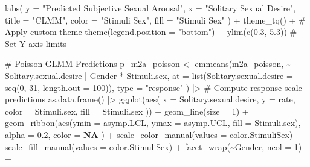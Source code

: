 \documentclass[
  bookmarksnumbered]{article}
\newenvironment{Shaded}{\begin{snugshade}}{\end{snugshade}}
\newcommand{\AttributeTok}[1]{\textcolor[rgb]{0.80,0.80,0.80}{#1}}
\newcommand{\CommentTok}[1]{\textcolor[rgb]{0.50,0.62,0.50}{#1}}
\newcommand{\ConstantTok}[1]{\textcolor[rgb]{0.86,0.64,0.64}{\textbf{#1}}}
\newcommand{\DecValTok}[1]{\textcolor[rgb]{0.86,0.86,0.80}{#1}}
\newcommand{\FloatTok}[1]{\textcolor[rgb]{0.75,0.75,0.82}{#1}}
\newcommand{\FunctionTok}[1]{\textcolor[rgb]{0.94,0.94,0.56}{#1}}
\newcommand{\NormalTok}[1]{\textcolor[rgb]{0.80,0.80,0.80}{#1}}
\newcommand{\OtherTok}[1]{\textcolor[rgb]{0.94,0.94,0.56}{#1}}
\newcommand{\SpecialCharTok}[1]{\textcolor[rgb]{0.86,0.64,0.64}{#1}}
\newcommand{\StringTok}[1]{\textcolor[rgb]{0.80,0.58,0.58}{#1}}
\begin{document}
\begin{Shaded}
\begin{Highlighting}[]
  \FunctionTok{labs}\NormalTok{(}
    \AttributeTok{y =} \StringTok{"Predicted Subjective Sexual Arousal"}\NormalTok{, }\AttributeTok{x =} \StringTok{"Solitary Sexual Desire"}\NormalTok{,}
    \AttributeTok{title =} \StringTok{"CLMM"}\NormalTok{,}
    \AttributeTok{color =} \StringTok{"Stimuli Sex"}\NormalTok{, }\AttributeTok{fill =} \StringTok{"Stimuli Sex"}
\NormalTok{  ) }\SpecialCharTok{+}
  \FunctionTok{theme\_tq}\NormalTok{() }\SpecialCharTok{+} \CommentTok{\# Apply custom theme}
  \FunctionTok{theme}\NormalTok{(}\AttributeTok{legend.position =} \StringTok{"bottom"}\NormalTok{) }\SpecialCharTok{+}
  \FunctionTok{ylim}\NormalTok{(}\FunctionTok{c}\NormalTok{(}\FloatTok{0.3}\NormalTok{, }\FloatTok{5.3}\NormalTok{)) }\CommentTok{\# Set Y{-}axis limits}

\CommentTok{\# Poisson GLMM Predictions}
\NormalTok{p\_m2a\_poisson }\OtherTok{\textless{}{-}} \FunctionTok{emmeans}\NormalTok{(m2a\_poisson, }\SpecialCharTok{\textasciitilde{}}\NormalTok{ Solitary.sexual.desire }\SpecialCharTok{|}\NormalTok{ Gender }\SpecialCharTok{*}\NormalTok{ Stimuli.sex,}
  \AttributeTok{at =} \FunctionTok{list}\NormalTok{(}\AttributeTok{Solitary.sexual.desire =} \FunctionTok{seq}\NormalTok{(}\DecValTok{0}\NormalTok{, }\DecValTok{31}\NormalTok{, }\AttributeTok{length.out =} \DecValTok{100}\NormalTok{)),}
  \AttributeTok{type =} \StringTok{"response"}
\NormalTok{) }\SpecialCharTok{|\textgreater{}} \CommentTok{\# Compute response{-}scale predictions}
  \FunctionTok{as.data.frame}\NormalTok{() }\SpecialCharTok{|\textgreater{}}
  \FunctionTok{ggplot}\NormalTok{(}\FunctionTok{aes}\NormalTok{(}
    \AttributeTok{x =}\NormalTok{ Solitary.sexual.desire, }\AttributeTok{y =}\NormalTok{ rate,}
    \AttributeTok{color =}\NormalTok{ Stimuli.sex, }\AttributeTok{fill =}\NormalTok{ Stimuli.sex}
\NormalTok{  )) }\SpecialCharTok{+}
  \FunctionTok{geom\_line}\NormalTok{(}\AttributeTok{size =} \DecValTok{1}\NormalTok{) }\SpecialCharTok{+}
  \FunctionTok{geom\_ribbon}\NormalTok{(}\FunctionTok{aes}\NormalTok{(}\AttributeTok{ymin =}\NormalTok{ asymp.LCL, }\AttributeTok{ymax =}\NormalTok{ asymp.UCL, }\AttributeTok{fill =}\NormalTok{ Stimuli.sex),}
    \AttributeTok{alpha =} \FloatTok{0.2}\NormalTok{, }\AttributeTok{color =} \ConstantTok{NA}
\NormalTok{  ) }\SpecialCharTok{+}
  \FunctionTok{scale\_color\_manual}\NormalTok{(}\AttributeTok{values =}\NormalTok{ color.StimuliSex) }\SpecialCharTok{+}
  \FunctionTok{scale\_fill\_manual}\NormalTok{(}\AttributeTok{values =}\NormalTok{ color.StimuliSex) }\SpecialCharTok{+}
  \FunctionTok{facet\_wrap}\NormalTok{(}\SpecialCharTok{\textasciitilde{}}\NormalTok{Gender, }\AttributeTok{ncol =} \DecValTok{1}\NormalTok{) }\SpecialCharTok{+}

\end{Highlighting}
\end{Shaded}
\end{document}
